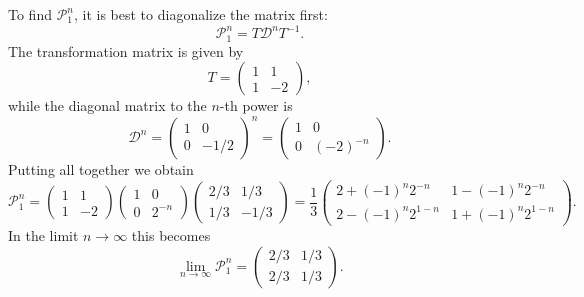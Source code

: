 To find $\mathcal{P}_1^{n}$, it is best to diagonalize the matrix first:
\begin{equation}
  \mathcal{P}_{1}^{n} = T \mathcal{D}^{n} T^{-1}.
\end{equation}
The transformation matrix is given by
\begin{equation}
  T =
  \begin{pmatrix}
    1 & 1 \\
    1 & -2
  \end{pmatrix},
\end{equation}
while the diagonal matrix to the $n$-th power is
\begin{equation}
  \mathcal{D}^{n} =
  \begin{pmatrix}
    1 & 0 \\
    0 & -1/2
  \end{pmatrix}^n
  =
  \begin{pmatrix}
    1 & 0 \\
    0 & (-2)^{-n}
  \end{pmatrix}.
\end{equation}
Putting all together we obtain
\begin{equation}
  \mathcal{P}_{1}^{n} =
  \begin{pmatrix}
    1 & 1 \\
    1 & -2
  \end{pmatrix}
  \begin{pmatrix}
    1 & 0 \\
    0 & 2^{-n}
  \end{pmatrix}
  \begin{pmatrix}
    2/3 & 1/3 \\
    1/3 & -1/3
  \end{pmatrix}
  =\frac{1}{3}
  \begin{pmatrix}
    2 + (-1)^{n} 2^{-n} & 1 - (-1)^{n} 2^{-n} \\
    2 - (-1)^{n} 2^{1-n} & 1 + (-1)^{n} 2^{1-n}
  \end{pmatrix}.
\end{equation}
In the limit $n\to \infty$ this becomes
\begin{equation}
  \lim_{n \to \infty} \mathcal{P}_{1}^{n} =
  \begin{pmatrix}
    2/3 & 1/3 \\
    2/3 & 1/3
  \end{pmatrix}.
\end{equation}

